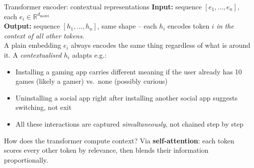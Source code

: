 \documentclass[aspectratio=169,t]{beamer}
\begin{document}
\begin{frame}{Transformer encoder: contextual representations}
    \textbf{Input:} sequence $[e_1, \ldots, e_n]$,\; each $e_i \in \mathbb{R}^{d_\text{model}}$\\[0.2cm]
    \textbf{Output:} sequence $[h_1, \ldots, h_n]$, same shape -- each $h_i$ encodes token $i$ \emph{in the context of all other tokens}.\\[0.3cm]
    A plain embedding $e_i$ always encodes the same thing regardless of what is around it. A \emph{contextualised} $h_i$ adapts e.g.:\\[0.1cm]
    \begin{itemize}
    \item Installing a gaming app carries different meaning if the user already has 10 games (likely a gamer) vs.\ none (possibly curious)
    \item Uninstalling a social app right after installing another social app suggests switching, not exit
    \item All these interactions are captured \emph{simultaneously}, not chained step by step    
\end{itemize}
\vspace{0.35cm}
How does the transformer compute context? Via \textbf{self-attention}: each token scores every other token by relevance, then blends their information proportionally.\\[0.35cm]

\end{frame}
\end{document}
